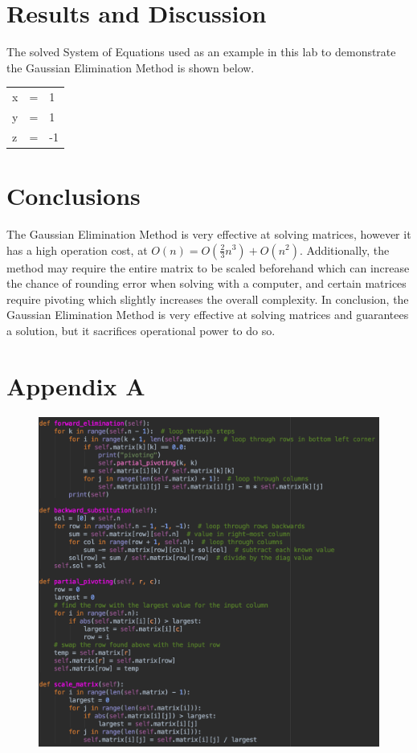 \documentclass[12pt, letterpaper]{article}
\begin{document}
\section{Results and Discussion}
    	The solved System of Equations used as an example in this lab to demonstrate the Gaussian Elimination Method is shown below.
	
	\begin{center}
	\hspace{.25cm}\scalebox{1.75}{$\rightarrow$}
		\begin{tabu} to 0.01\textwidth{X[$] X[$] X[$]}
			x & = & 1 \\
			y & = & 1 \\
			z & = & -1 \\
		\end{tabu}
	\end{center}


\section{Conclusions}
	The Gaussian Elimination Method is very effective at solving matrices, however it has a high operation cost, at $O(n)=O(\frac{2}{3}n^3) + O(n^2)$. Additionally, the method may require the entire matrix to be scaled beforehand which can increase the chance of rounding error when solving with a computer, and certain matrices require pivoting which slightly increases the overall complexity. In conclusion, the Gaussian Elimination Method is very effective at solving matrices and guarantees a solution, but it sacrifices operational power to do so. 

\pagebreak


\appendix
	\section{Appendix A}
            		\begin{figure}[htp]
            			\centering
            			\includegraphics[width=1.0\linewidth]{PythonCode.png}
            		\end{figure}
\end{document}
